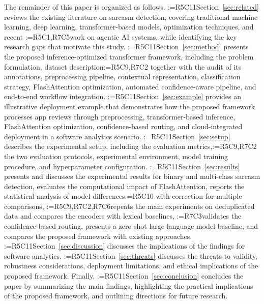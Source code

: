 \documentclass[a4paper,fleqn]{cas-sc}
\makeatletter
\newif\iftracked
\newcommand{\rv@setcolour}[1]{%
  \IfStrEq{#1}{R7C7}{\color{rvEdit}}{%
    \IfSubStr{#1}{R5}{\IfSubStr{#1}{R7}{\color{rvBoth}}{\color{rvFive}}}{\color{rvSeven}}}}
\newcommand{\rv@tag}[1]{\textsuperscript{\sffamily\bfseries\scriptsize[\StrSubstitute{#1}{,}{, }]}\,}
\newcommand{\rv@recordone}[1]{%
  \edef\rv@i{#1}%
  \ifcsdef{rv@n@\rv@i}{}{\csgdef{rv@n@\rv@i}{0}}%
  \csxdef{rv@n@\rv@i}{\the\numexpr\csuse{rv@n@\rv@i}+1\relax}%
  \begingroup\edef\@currentlabel{\rv@i}\label{rv:\rv@i:\csuse{rv@n@\rv@i}}\endgroup}
\newcommand{\rv@record}[1]{\@for\rv@id:=#1\do{\expandafter\rv@recordone\expandafter{\rv@id}}}
\DeclareRobustCommand{\rc}[2]{\rv@record{#1}\iftracked{\rv@setcolour{#1}\rv@tag{#1}#2}\else#2\fi}
\DeclareRobustCommand{\rcrep}[3]{\rv@record{#1}\iftracked{\rv@setcolour{#1}\rv@tag{#1}\rv@strike{#2} #3}\else#3\fi}
\makeatother
\begin{document}
The remainder of this paper is organized as follows. \rcrep{R5C11}{(Section 2)}{Section~\ref{sec:related}} reviews the existing literature on sarcasm detection, covering traditional machine learning, deep learning, transformer-based models, optimization techniques, and recent \rcrep{R5C1,R7C5}{agentic AI approaches}{work on agentic AI systems}, while identifying the key research gaps that motivate this study. \rcrep{R5C11}{(Section 3)}{Section~\ref{sec:method}} presents the proposed inference-optimized transformer framework, including the problem formulation, dataset description\rc{R5C9,R7C2}{ together with the audit of its annotations}, preprocessing pipeline, contextual representation, classification strategy, FlashAttention optimization, automated confidence-aware pipeline, and end-to-end workflow integration. \rcrep{R5C11}{(Section 4)}{Section~\ref{sec:example}} provides an illustrative deployment example that demonstrates how the proposed framework processes app reviews through preprocessing, transformer-based inference, FlashAttention optimization, confidence-based routing, and cloud-integrated deployment in a software analytics scenario. \rcrep{R5C11}{(Section 5)}{Section~\ref{sec:setup}} describes the experimental setup, including the evaluation metrics,\rc{R5C9,R7C2}{ the two evaluation protocols,} experimental environment, model training procedure, and hyperparameter configuration. \rcrep{R5C11}{(Section 6)}{Section~\ref{sec:results}} presents and discusses the experimental results for binary and multi-class sarcasm detection, evaluates the computational impact of FlashAttention, reports the statistical analysis of model differences\rc{R5C10}{ with correction for multiple comparisons}, \rc{R5C9,R7C2,R7C6}{repeats the main experiments on deduplicated data and compares the encoders with lexical baselines, }\rc{R7C3}{validates the confidence-based routing, }presents a zero-shot large language model baseline, and compares the proposed framework with existing approaches. \rc{R5C11}{Section~\ref{sec:discussion} discusses the implications of the findings for software analytics.} \rcrep{R5C11}{(Section 8)}{Section~\ref{sec:threats}} discusses the threats to validity, robustness considerations, deployment limitations, and ethical implications of the proposed framework. Finally, \rcrep{R5C11}{(Section 9)}{Section~\ref{sec:conclusion}} concludes the paper by summarizing the main findings, highlighting the practical implications of the proposed framework, and outlining directions for future research.

\end{document}
